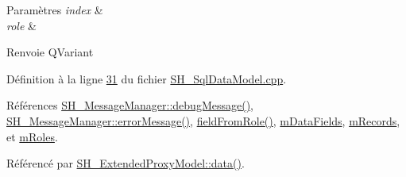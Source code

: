 \begin{DoxyParams}{Paramètres}
{\em index} & \\
\hline
{\em role} & \\
\hline
\end{DoxyParams}
\begin{DoxyReturn}{Renvoie}
Q\-Variant 
\end{DoxyReturn}


Définition à la ligne \hyperlink{SH__SqlDataModel_8cpp_source_l00031}{31} du fichier \hyperlink{SH__SqlDataModel_8cpp_source}{S\-H\-\_\-\-Sql\-Data\-Model.\-cpp}.



Références \hyperlink{classSH__MessageManager_a379f2aa0a590a5add34dbe91f98b2ff7}{S\-H\-\_\-\-Message\-Manager\-::debug\-Message()}, \hyperlink{classSH__MessageManager_a0cb4f06cf67539457482ba1c8544eb06}{S\-H\-\_\-\-Message\-Manager\-::error\-Message()}, \hyperlink{classSH__SqlDataModel_a3c6539114dd06aa8043e7a4e9762f6f4}{field\-From\-Role()}, \hyperlink{classSH__SqlDataModel_a3e998f75dd5b3193783612002461888d}{m\-Data\-Fields}, \hyperlink{classSH__SqlDataModel_aa58096989daac3cd3fdea5e6dd4f27ee}{m\-Records}, et \hyperlink{classSH__SqlDataModel_ad1e46c72a6aeb83e3e7bb0c3110d12a4}{m\-Roles}.



Référencé par \hyperlink{classSH__ExtendedProxyModel_afbc947efbe1107fc5bf8926c52902a1c}{S\-H\-\_\-\-Extended\-Proxy\-Model\-::data()}.


